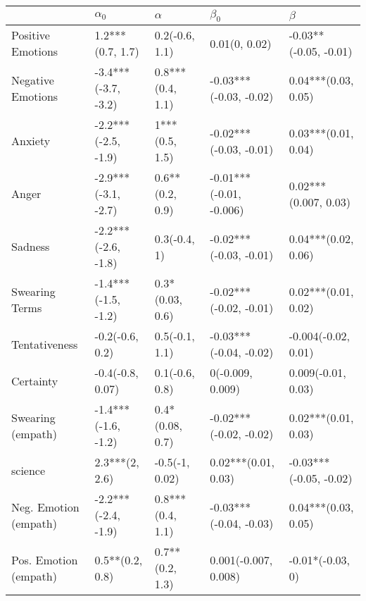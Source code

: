 \begin{tabular}{lllll}
\toprule
{} &           $\alpha_0$ &          $\alpha$ &                $\beta_0$ &                 $\beta$ \\
\midrule
Positive Emotions     &     1.2***(0.7, 1.7) &    0.2(-0.6, 1.1) &            0.01(0, 0.02) &   -0.03**(-0.05, -0.01) \\
Negative Emotions     &  -3.4***(-3.7, -3.2) &  0.8***(0.4, 1.1) &   -0.03***(-0.03, -0.02) &     0.04***(0.03, 0.05) \\
Anxiety               &  -2.2***(-2.5, -1.9) &    1***(0.5, 1.5) &   -0.02***(-0.03, -0.01) &     0.03***(0.01, 0.04) \\
Anger                 &  -2.9***(-3.1, -2.7) &   0.6**(0.2, 0.9) &  -0.01***(-0.01, -0.006) &    0.02***(0.007, 0.03) \\
Sadness               &  -2.2***(-2.6, -1.8) &      0.3(-0.4, 1) &   -0.02***(-0.03, -0.01) &     0.04***(0.02, 0.06) \\
Swearing Terms        &  -1.4***(-1.5, -1.2) &   0.3*(0.03, 0.6) &   -0.02***(-0.02, -0.01) &     0.02***(0.01, 0.02) \\
Tentativeness         &      -0.2(-0.6, 0.2) &    0.5(-0.1, 1.1) &   -0.03***(-0.04, -0.02) &     -0.004(-0.02, 0.01) \\
Certainty             &     -0.4(-0.8, 0.07) &    0.1(-0.6, 0.8) &         0(-0.009, 0.009) &      0.009(-0.01, 0.03) \\
Swearing (empath)     &  -1.4***(-1.6, -1.2) &   0.4*(0.08, 0.7) &   -0.02***(-0.02, -0.02) &     0.02***(0.01, 0.03) \\
science               &       2.3***(2, 2.6) &    -0.5(-1, 0.02) &      0.02***(0.01, 0.03) &  -0.03***(-0.05, -0.02) \\
Neg. Emotion (empath) &  -2.2***(-2.4, -1.9) &  0.8***(0.4, 1.1) &   -0.03***(-0.04, -0.03) &     0.04***(0.03, 0.05) \\
Pos. Emotion (empath) &      0.5**(0.2, 0.8) &   0.7**(0.2, 1.3) &     0.001(-0.007, 0.008) &        -0.01*(-0.03, 0) \\
\bottomrule
\end{tabular}
